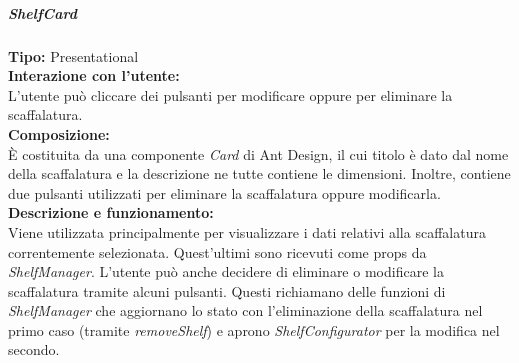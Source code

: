 \newpage
\subparagraph{\colorbox{verde_uml}{ShelfCard}}
\textbf{Tipo:} Presentational \\
\textbf{Interazione con l'utente:} \\
L'utente può cliccare dei pulsanti per modificare oppure per eliminare la scaffalatura.\\
\textbf{Composizione:} \\
È costituita da una componente \textit{Card} di Ant Design, il cui titolo è dato dal nome della scaffalatura e la descrizione ne tutte contiene le dimensioni. Inoltre, contiene due pulsanti utilizzati per eliminare la scaffalatura oppure modificarla.\\
\textbf{Descrizione e funzionamento:} \\
Viene utilizzata principalmente per visualizzare i dati relativi alla scaffalatura correntemente selezionata. Quest'ultimi sono ricevuti come props da \textit{ShelfManager}. L'utente può anche decidere di eliminare o modificare la scaffalatura tramite alcuni pulsanti. Questi richiamano delle funzioni di \textit{ShelfManager} che aggiornano lo stato con l'eliminazione della scaffalatura nel primo caso (tramite \textit{removeShelf}) e aprono \textit{ShelfConfigurator} per la modifica nel secondo. 

